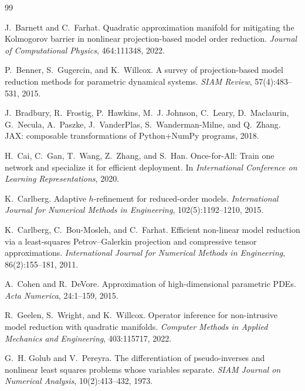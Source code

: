 \begin{thebibliography}{99}

J.~Barnett and C.~Farhat.
\newblock Quadratic approximation manifold for mitigating the
Kolmogorov barrier in nonlinear projection-based model order reduction.
\newblock \emph{Journal of Computational Physics}, 464:111348, 2022.

P.~Benner, S.~Gugercin, and K.~Willcox.
\newblock A survey of projection-based model reduction methods for
parametric dynamical systems.
\newblock \emph{SIAM Review}, 57(4):483--531, 2015.

J.~Bradbury, R.~Frostig, P.~Hawkins, M.~J. Johnson, C.~Leary,
D.~Maclaurin, G.~Necula, A.~Paszke, J.~VanderPlas, S.~Wanderman-Milne,
and Q.~Zhang.
\newblock JAX: composable transformations of Python+NumPy programs, 2018.

H.~Cai, C.~Gan, T.~Wang, Z.~Zhang, and S.~Han.
\newblock Once-for-All: Train one network and specialize it for
efficient deployment.
\newblock In \emph{International Conference on Learning Representations},
2020.

K.~Carlberg.
\newblock Adaptive $h$-refinement for reduced-order models.
\newblock \emph{International Journal for Numerical Methods in Engineering},
102(5):1192--1210, 2015.

K.~Carlberg, C.~Bou-Mosleh, and C.~Farhat.
\newblock Efficient non-linear model reduction via a least-squares
Petrov--Galerkin projection and compressive tensor approximations.
\newblock \emph{International Journal for Numerical Methods in
Engineering}, 86(2):155--181, 2011.

A.~Cohen and R.~DeVore.
\newblock Approximation of high-dimensional parametric PDEs.
\newblock \emph{Acta Numerica}, 24:1--159, 2015.

R.~Geelen, S.~Wright, and K.~Willcox.
\newblock Operator inference for non-intrusive model reduction with
quadratic manifolds.
\newblock \emph{Computer Methods in Applied Mechanics and Engineering},
403:115717, 2022.

G.~H. Golub and V.~Pereyra.
\newblock The differentiation of pseudo-inverses and nonlinear least squares
problems whose variables separate.
\newblock \emph{SIAM Journal on Numerical Analysis}, 10(2):413--432, 1973.


\end{thebibliography}
